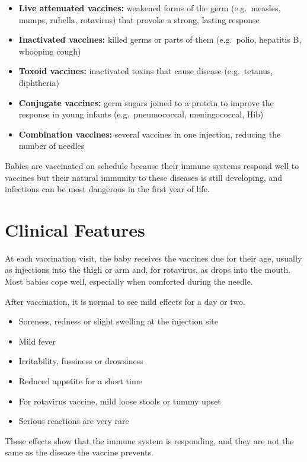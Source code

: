 \begin{itemize}
    \item \textbf{Live attenuated vaccines:} weakened forms of the germ (e.g.\ measles, mumps, rubella, rotavirus) that provoke a strong, lasting response
    \item \textbf{Inactivated vaccines:} killed germs or parts of them (e.g.\ polio, hepatitis B, whooping cough)
    \item \textbf{Toxoid vaccines:} inactivated toxins that cause disease (e.g.\ tetanus, diphtheria)
    \item \textbf{Conjugate vaccines:} germ sugars joined to a protein to improve the response in young infants (e.g.\ pneumococcal, meningococcal, Hib)
    \item \textbf{Combination vaccines:} several vaccines in one injection, reducing the number of needles
\end{itemize}

Babies are vaccinated on schedule because their immune systems respond well to vaccines but their natural immunity to these diseases is still developing, and infections can be most dangerous in the first year of life.

\section*{Clinical Features}
At each vaccination visit, the baby receives the vaccines due for their age, usually as injections into the thigh or arm and, for rotavirus, as drops into the mouth. Most babies cope well, especially when comforted during the needle.

After vaccination, it is normal to see mild effects for a day or two.

\begin{itemize}
    \item Soreness, redness or slight swelling at the injection site
    \item Mild fever
    \item Irritability, fussiness or drowsiness
    \item Reduced appetite for a short time
    \item For rotavirus vaccine, mild loose stools or tummy upset
    \item Serious reactions are very rare
\end{itemize}

These effects show that the immune system is responding, and they are not the same as the disease the vaccine prevents.

